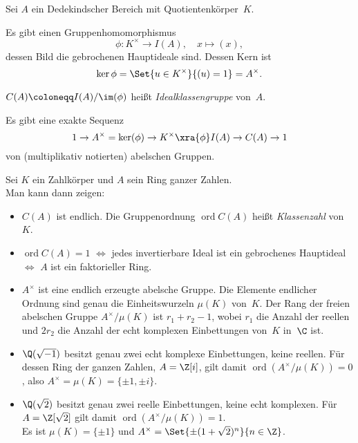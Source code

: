 \documentclass{cheat-sheet}
\DeclareMathOperator{\ord}{ord} %
\begin{document}
\begin{defn}
  Sei $A$ ein Dedekindscher Bereich mit Quotientenkörper~$K$.
\end{defn}

\begin{bem}
  Es gibt einen Gruppenhomomorphismus
  \[
    \phi : K^{\times} \to I(A), \quad x \mapsto (x),
  \]
  dessen Bild die gebrochenen Hauptideale sind.
  Dessen Kern ist
  \[
    \ker \phi = \Set{u \in K^{\times}}{(u) = 1} = A^{\times}.
  \]
\end{bem}

\begin{defn}
  $C(A) \coloneqq I(A) / \im(\phi)$ heißt \emph{Idealklassengruppe} von~$A$.
\end{defn}

\begin{bem}
  Es gibt eine exakte Sequenz
  \[
    1 \to A^{\times} = \ker(\phi) \to K^{\times} \xra{\phi} I(A) \to C(A) \to 1
  \]
  von (multiplikativ notierten) abelschen Gruppen.
\end{bem}

\begin{bem}
  Sei $K$ ein Zahlkörper und $A$ sein Ring ganzer Zahlen. \\
  Man kann dann zeigen:
  \begin{itemize}
    \item $C(A)$ ist endlich.
    Die Gruppenordnung $\ord C(A)$ heißt \textit{Klassenzahl} von $K$.
    \item $\ord C(A) = 1$ $\iff$ jedes invertierbare Ideal ist ein gebrochenes Hauptideal $\iff$ $A$ ist ein faktorieller Ring.
    \item $A^{\times}$ ist eine endlich erzeugte abelsche Gruppe.
    Die Elemente endlicher Ordnung sind genau die Einheitswurzeln $\mu(K)$ von~$K$.
    Der Rang der freien abelschen Gruppe $A^{\times} / \mu(K)$ ist $r_1 + r_2 - 1$, wobei $r_1$ die Anzahl der reellen und $2 r_2$ die Anzahl der echt komplexen Einbettungen von~$K$ in~$\C$ ist.
  \end{itemize}
\end{bem}

\begin{bspe}
  \begin{itemize}
    \item $\Q(\sqrt{-1})$ besitzt genau zwei echt komplexe Einbettungen, keine reellen.
    Für dessen Ring der ganzen Zahlen, $A = \Z[i]$, gilt damit $\ord(A^{\times} / \mu(K)) = 0$, also $A^{\times} = \mu(K) = \{ \pm 1, \pm i \}$.
    \item $\Q(\sqrt{2})$ besitzt genau zwei reelle Einbettungen, keine echt komplexen.
    Für $A = \Z[\sqrt{2}]$ gilt damit $\ord(A^{\times} / \mu(K)) = 1$. \\
    Es ist $\mu(K) = \{ \pm 1 \}$ und $A^{\times} = \Set{\pm (1 + \sqrt{2})^n}{n \in \Z}$.
  \end{itemize}
\end{bspe}
\end{document}
